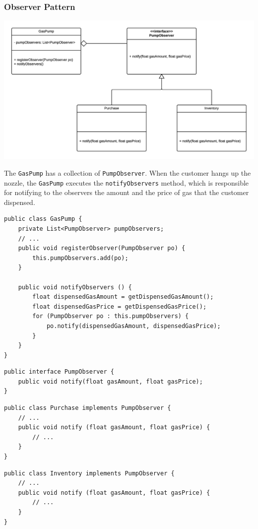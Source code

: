\documentclass[11pt, a4paper]{article}
\newcommand{\settextlisting}{\lstset{ basicstyle=\small\ttfamily }}
\newcommand{\setcodelisting}{\lstset{ basicstyle=\footnotesize\ttfamily }}
\begin{document}
\subsubsection*{Observer Pattern}

\includegraphics[width=\textwidth]{ObserverPattern.png}

\settextlisting
The \lstinline|GasPump| has a collection of \lstinline|PumpObserver|.
When the customer hangs up the nozzle, the \lstinline|GasPump| executes the \lstinline|notifyObservers| method, which is responsible for notifying to the observers the amount and the price of gas that the customer dispensed.

\bigskip
\setcodelisting
\begin{lstlisting}
public class GasPump {
	private List<PumpObserver> pumpObservers;
	// ...
	public void registerObserver(PumpObserver po) {
		this.pumpObservers.add(po);
	}
	
	public void notifyObservers () {
		float dispensedGasAmount = getDispensedGasAmount();
		float dispensedGasPrice = getDispensedGasPrice();
		for (PumpObserver po : this.pumpObservers) {
			po.notify(dispensedGasAmount, dispensedGasPrice);
		}
	}
}
\end{lstlisting}


\begin{lstlisting}
public interface PumpObserver {
	public void notify(float gasAmount, float gasPrice);
}
\end{lstlisting}


\begin{lstlisting}
public class Purchase implements PumpObserver {
	// ...
	public void notify (float gasAmount, float gasPrice) {
		// ...
	}
}
\end{lstlisting}


\begin{lstlisting}
public class Inventory implements PumpObserver {
	// ...
	public void notify (float gasAmount, float gasPrice) {
		// ...
	}
}
\end{lstlisting}
\end{document}
